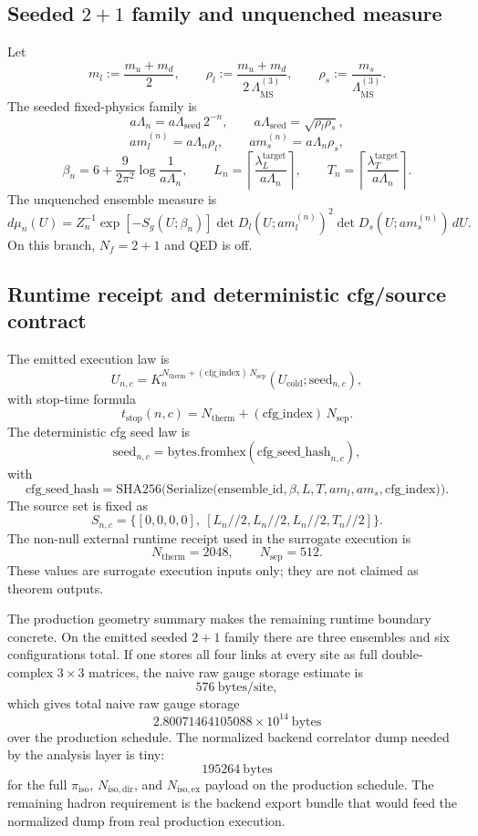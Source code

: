 \documentclass[11pt]{article}
\begin{document}
\subsection{Seeded \(2+1\) family and unquenched measure}

Let
\[
m_l := \frac{m_u+m_d}{2},
\qquad
\rho_l := \frac{m_u+m_d}{2\,\Lambda_{\overline{\mathrm{MS}}}^{(3)}},
\qquad
\rho_s := \frac{m_s}{\Lambda_{\overline{\mathrm{MS}}}^{(3)}}.
\]
The seeded fixed-physics family is
\[
a\Lambda_n = a\Lambda_{\mathrm{seed}}\,2^{-n},
\qquad
a\Lambda_{\mathrm{seed}} = \sqrt{\rho_l \rho_s},
\]
\[
a m_l^{(n)} = a\Lambda_n \rho_l,
\qquad
a m_s^{(n)} = a\Lambda_n \rho_s,
\]
\[
\beta_n = 6 + \frac{9}{2\pi^2}\log\!\frac{1}{a\Lambda_n},
\qquad
L_n = \left\lceil \frac{\lambda_L^{\mathrm{target}}}{a\Lambda_n}\right\rceil,
\qquad
T_n = \left\lceil \frac{\lambda_T^{\mathrm{target}}}{a\Lambda_n}\right\rceil.
\]
The unquenched ensemble measure is
\[
d\mu_n(U)
=
Z_n^{-1}
\exp[-S_g(U;\beta_n)]
\det D_l(U; a m_l^{(n)})^2
\det D_s(U; a m_s^{(n)})
\,dU.
\]
On this branch, \(N_f=2+1\) and QED is off.

\subsection{Runtime receipt and deterministic cfg/source contract}

The emitted execution law is
\[
U_{n,c}
=
K_n^{N_{\mathrm{therm}} + (\mathrm{cfg\_index})\,N_{\mathrm{sep}}}(U_{\mathrm{cold}}; \mathrm{seed}_{n,c}),
\]
with stop-time formula
\[
t_{\mathrm{stop}}(n,c)
=
N_{\mathrm{therm}} + (\mathrm{cfg\_index})\,N_{\mathrm{sep}}.
\]
The deterministic cfg seed law is
\[
\mathrm{seed}_{n,c}
=
\mathrm{bytes.fromhex}(\mathrm{cfg\_seed\_hash}_{n,c}),
\]
with
\[
\mathrm{cfg\_seed\_hash}
=
\mathrm{SHA256}\!\Big(
\mathrm{Serialize}\!\big(
\mathrm{ensemble\_id},\beta,L,T,a m_l,a m_s,\mathrm{cfg\_index}
\big)
\Big).
\]
The source set is fixed as
\[
S_{n,c} = \{ [0,0,0,0],\ [L_n//2, L_n//2, L_n//2, T_n//2] \}.
\]
The non-null external runtime receipt used in the surrogate execution is
\[
N_{\mathrm{therm}} = 2048,
\qquad
N_{\mathrm{sep}} = 512.
\]
These values are surrogate execution inputs only; they are not claimed as theorem outputs.

The production geometry summary makes the remaining runtime boundary concrete. On the emitted
seeded \(2+1\) family there are three ensembles and six configurations total. If one stores all
four links at every site as full double-complex \(3\times 3\) matrices, the naive raw gauge
storage estimate is
\[
576\ \mathrm{bytes/site},
\]
which gives total naive raw gauge storage
\[
2.80071464105088\times 10^{14}\ \mathrm{bytes}
\]
over the production schedule. The normalized backend correlator dump needed by the
analysis layer is tiny:
\[
195264\ \mathrm{bytes}
\]
for the full \(\pi_{\mathrm{iso}}\), \(N_{\mathrm{iso,dir}}\), and \(N_{\mathrm{iso,ex}}\)
payload on the production schedule. The remaining hadron requirement is the backend export bundle
that would feed the normalized dump from real production execution.
\end{document}
